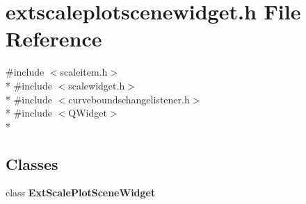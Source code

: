 \section{extscaleplotscenewidget.\+h File Reference}
\label{bk3_2extscaleplotscenewidget_2extscaleplotscenewidget_8h}
{\ttfamily \#include $<$scaleitem.\+h$>$}\\*
{\ttfamily \#include $<$scalewidget.\+h$>$}\\*
{\ttfamily \#include $<$curveboundschangelistener.\+h$>$}\\*
{\ttfamily \#include $<$Q\+Widget$>$}\\*
\subsection*{Classes}
\begin{DoxyCompactItemize}
\item 
class {\bf Ext\+Scale\+Plot\+Scene\+Widget}
\end{DoxyCompactItemize}
